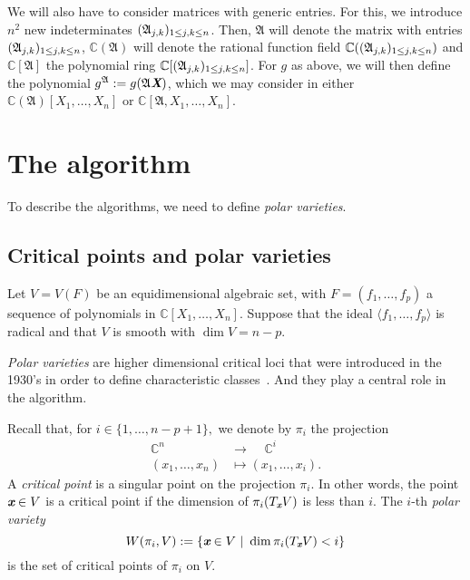 \documentclass[a4paper]{article}
\def\A{\mathfrak{A}}
\def\Xb{\textit{\textbf{X}}}
\def\xb{\textit{\textbf{x}}}
\def\C{\mathbb{C}}
\def\Wi{W(\pi_i,V)}
\begin{document}
We will also have to consider matrices with generic entries. For this,
we introduce $n^2$ new indeterminates $(\frak A_{j,k})_{1\le j,k \le
  n}$. Then, $\A$ will denote the matrix with entries $(\frak
A_{j,k})_{1\le j,k \le n}$, $\C(\A)$ will denote the rational function
field $\C((\frak A_{j,k})_{1\le j,k \le n})$ and $\C[\A]$ the
polynomial ring $\C[(\frak A_{j,k})_{1\le j,k \le n}]$.  For $g$ as
above, we will then define the polynomial $g^\A:=g(\A \Xb)$, 
which we may consider in either
$\C(\A)[X_1,\dots,X_n]$ or $\C[\A,X_1,\dots,X_n]$.




\section{The algorithm}
To describe the algorithms, we need to
define {\em polar varieties}. 


\subsection{Critical points and polar varieties} 
Let $V=V(F)$ be an equidimensional algebraic set, with $F = (f_1,\hdots,f_p)$ a sequence of polynomials in  $\C[X_1,\hdots,X_n]$. Suppose that the ideal $\langle f_1,\hdots, f_p \rangle $ is radical and that $V$ is smooth with $\dim V = n-p$.


{\em Polar varieties} are higher dimensional critical loci that were introduced in the 1930's in order to define characteristic
classes~\cite{Piene78,Teissier88}. And they play a central role in the algorithm. 

Recall that, for $i \in
\{1,\hdots,n-p+1\},$ we denote by $\pi_i$ the projection 
%
\begin{align*}
\C^n~~~~~ &\rightarrow~~~~~ \C^i \\
(x_1,\hdots,x_n) &\mapsto  (x_1,\hdots,x_i).    
\end{align*} 
%
A \textit{critical point} is a singular point on the projection $\pi_i.$ In other words, the point $\xb \in V$ is a critical point if the dimension of $\pi_i( T_{\xb}V)$ is less than $i$.
The $i$-th
\textit{polar variety} 
\[
\Wi := \left\{\xb \in V~|~\dim \pi_i(T_\xb
V) < i\right\}
\]
is the set of critical points of $\pi_i$ on $V$. 
%
\end{document}
